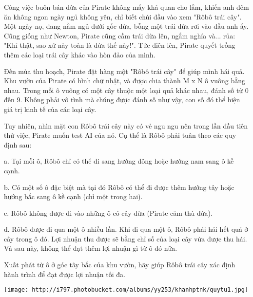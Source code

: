Công việc buôn bán dừa của Pirate không mấy khả quan cho lắm, khiến anh đêm ăn không ngon ngày ngủ không yên, chỉ biết chúi đầu vào xem "Rôbô trái cây". Một ngày nọ, đang nằm ngủ dưới gốc dừa, bỗng một trái dừa rơi vào đầu anh ấy. Cũng giống như Newton, Pirate cũng cầm trái dừa lên, ngắm nghía và... rủa: "Khỉ thật, sao xứ này toàn là dừa thế này!". Tức điên lên, Pirate quyết trồng thêm các loại trái cây khác vào hòn đảo của mình.  

   Đến mùa thu hoạch, Pirate đặt hàng một "Rôbô trái cây" để giúp mình hái quả. Khu vườn của Pirate có hình chữ nhật, và được chia thành M x N ô vuông bằng nhau. Trong mỗi ô vuông có một cây thuộc một loại quả khác nhau, đánh số từ 0 đến 9. Không phải vô tình mà chúng được đánh số như vậy, con số đó thể hiện giá trị kinh tế của các loại cây.  

   Tuy nhiên, nhìn mặt con Rôbô trái cây này có vẻ ngu ngu nên trong lần đầu tiên thử việc, Pirate muốn test AI của nó. Cụ thể là Rôbô phải tuân theo các quy định sau:  

   a. Tại mỗi ô, Rôbô chỉ có thể đi sang hướng đông hoặc hướng nam sang ô kề cạnh.  

   b. Có một số ô đặc biệt mà tại đó Rôbô có thể đi được thêm hướng tây hoặc hướng bắc sang ô kề cạnh (chỉ một trong hai).  

   c. Rôbô không được đi vào những ô có cây dừa (Pirate căm thù dừa).  

   d. Rôbô được đi qua một ô nhiều lần. Khi đi qua một ô, Rôbô phải hái hết quả ở cây trong ô đó. Lợi nhuận thu được sẽ bằng chỉ số của loại cây vừa được thu hái. Và sau này, không thể đạt thêm lợi nhuận gì từ ô đó nữa.  

   Xuất phát từ ô ở góc tây bắc của khu vườn, hãy giúp Rôbô trái cây xác định hành trình để đạt được lợi nhuận tối đa.  




\texttt{[image: http://i797.photobucket.com/albums/yy253/khanhptnk/quytu1.jpg]}